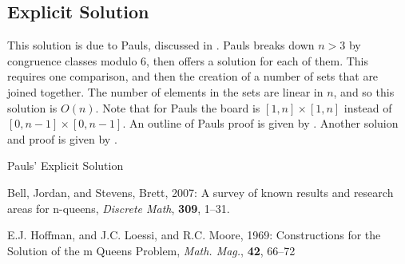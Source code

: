 \documentclass{article}
\begin{document}
\subsection*{Explicit Solution}
\label{sub:explicit_solution}

This solution is due to Pauls, discussed in \cite{jordanbell07}. Pauls breaks
down $n > 3$ by congruence classes modulo 6, then offers a solution for each of
them. This requires one comparison, and then the creation of a number of sets
that are joined together. The number of elements in the sets are linear in $n$,
and so this solution is $O(n)$. Note that for Pauls the board is $[1, n] \times
[1, n]$ instead of $[0, n-1] \times [0, n-1]$. An outline of Pauls proof is
given by \cite{jordanbell07}. Another soluion and proof is given by
\cite{hoffman69}.

\begin{algorithm}[H]
    \caption{Pauls' Explicit Solution}



\end{algorithm}

\begin{thebibliography}{9}

    Bell, Jordan, and Stevens, Brett,
    2007:
    A survey of known results and research areas for n-queens,
    \emph{Discrete Math},
    \textbf{309},
    1--31.

    E.J. Hoffman, and J.C. Loessi, and R.C. Moore,
    1969:
    Constructions for the Solution of the m Queens Problem,
    \emph{Math. Mag.},
    \textbf{42},
    66--72

\end{thebibliography}
\end{document}
